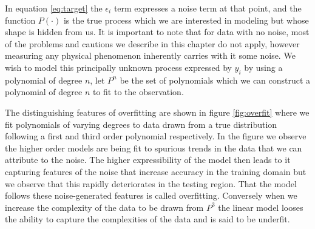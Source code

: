 In equation \ref{eq:target} the $\epsilon_i$ term expresses a noise term at that point, and the function $P(\cdot)$ is the true process which we are interested in modeling but whose shape is hidden from us. It is important to note that for data with no noise, most of the problems and cautions we describe in this chapter do not apply, however measuring any physical phenomenon inherently carries with it some noise. We wish to model this principally unknown process expressed by $y_i$ by using a polynomial of degree $n$, let $P^n$ be the set of polynomials which we can construct a polynomial of degree $n$ to fit to the observation. 

The distinguishing features of overfitting are shown in figure \ref{fig:overfit} where we fit polynomials of varying degrees to data drawn from a true distribution following a first and third order polynomial respectively. In the figure we observe the higher order models are being fit to spurious trends in the data that we can attribute to the noise. The higher expressibility of the model then leads to it capturing features of the noise that increase accuracy in the training domain but we observe that this rapidly deteriorates in the testing region. That the model follows these noise-generated features is called overfitting. Conversely when we increase the complexity of the data to be drawn from $P^3$ the linear model looses the ability to capture the complexities of the data and is said to be underfit.  

